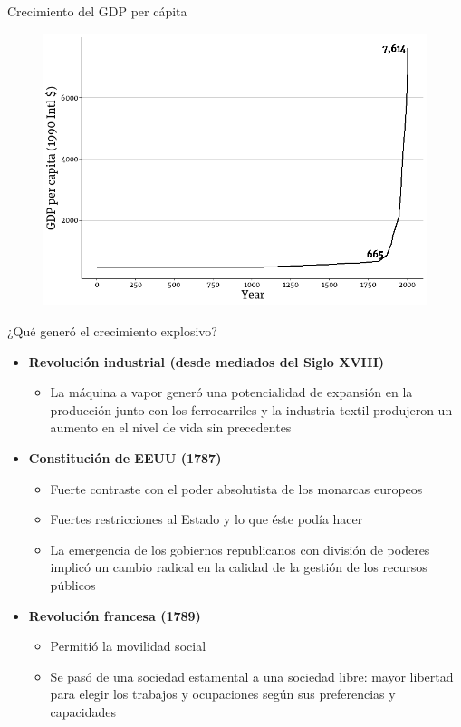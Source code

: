 \documentclass{beamer}
\begin{document}
\begin{frame}{Crecimiento del GDP per cápita}
    \begin{figure} [H]   \includegraphics[scale=0.5]{../Figures/C17.1.png}
\end{figure}
\end{frame}

\begin{frame}{¿Qué generó el crecimiento explosivo?}
    \begin{itemize}
    \item \textbf{Revolución industrial (desde mediados del Siglo XVIII)}
    \begin{itemize}
        \item La máquina a vapor generó una potencialidad de expansión en la producción junto con los ferrocarriles y la industria textil produjeron un aumento en el nivel de vida sin precedentes
    \end{itemize}
    \item \textbf{Constitución de EEUU (1787)}
     \begin{itemize}
        \item Fuerte contraste con el poder absolutista de los monarcas europeos
        \item Fuertes restricciones al Estado y lo que éste podía hacer
        \item La emergencia de los gobiernos republicanos con división de poderes implicó un cambio radical en la calidad de la gestión de los recursos públicos
    \end{itemize}
    \item \textbf{Revolución francesa (1789)}
    \begin{itemize}
        \item Permitió la movilidad social
        \item Se pasó de una sociedad estamental a una sociedad libre: mayor libertad para elegir los trabajos y ocupaciones según sus preferencias y capacidades
    \end{itemize}
\end{itemize}
\end{frame}
\end{document}
